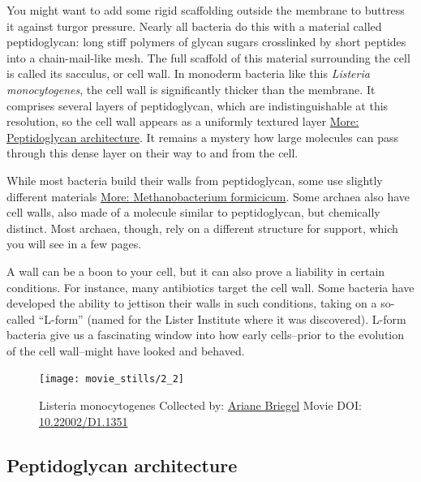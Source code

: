 \documentclass[]{tufte-book}
\begin{document}
You might want to add some rigid scaffolding outside the membrane to
buttress it against turgor pressure. Nearly all bacteria do this with a
material called peptidoglycan: long stiff polymers of glycan sugars
crosslinked by short peptides into a chain-mail-like mesh. The full
scaffold of this material surrounding the cell is called its sacculus,
or cell wall. In monoderm bacteria like this \emph{Listeria
monocytogenes}, the cell wall is significantly thicker than the
membrane. It comprises several layers of peptidoglycan, which are
indistinguishable at this resolution, so the cell wall appears as a
uniformly textured layer
\protect\hyperlink{Peptidoglycan_architecture}{More: Peptidoglycan
architecture}. It remains a mystery how large molecules can pass through
this dense layer on their way to and from the cell.

While most bacteria build their walls from peptidoglycan, some use
slightly different materials
\protect\hyperlink{Methanobacterium_formicicum}{More: Methanobacterium
formicicum}. Some archaea also have cell walls, also made of a molecule
similar to peptidoglycan, but chemically distinct. Most archaea, though,
rely on a different structure for support, which you will see in a few
pages.

A wall can be a boon to your cell, but it can also prove a liability in
certain conditions. For instance, many antibiotics target the cell wall.
Some bacteria have developed the ability to jettison their walls in such
conditions, taking on a so-called ``L-form'' (named for the Lister
Institute where it was discovered). L-form bacteria give us a
fascinating window into how early cells--prior to the evolution of the
cell wall--might have looked and behaved.





\begin{figure}
\texttt{[image: movie\_stills/2\_2]} \caption[Listeria monocytogenes Collected by:
\protect\hyperlink{ariane_briegel}{Ariane Briegel} Movie DOI:
\href{https://doi.org/10.22002/D1.1351}{10.22002/D1.1351}]{Listeria monocytogenes Collected by:
\protect\hyperlink{ariane_briegel}{Ariane Briegel} Movie DOI:
\href{https://doi.org/10.22002/D1.1351}{10.22002/D1.1351}}\label{fig:2-2}
\end{figure}

\hypertarget{Peptidoglycan_architecture}{\subsection{Peptidoglycan
architecture}\label{Peptidoglycan_architecture}}
\end{document}
